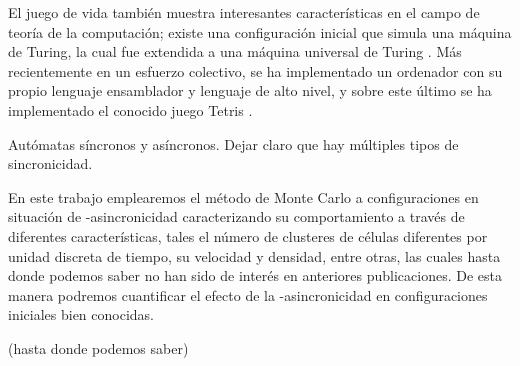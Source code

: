\documentclass[../proyecto.tex]{book}
\begin{document}
El juego de vida también muestra interesantes características en el campo de teoría de la computación; existe una configuración inicial que simula una máquina de Turing, la cual fue extendida a una máquina universal de Turing \cite{turing}. Más recientemente en un esfuerzo colectivo, se ha implementado un ordenador con su propio lenguaje ensamblador y lenguaje de alto nivel, y sobre este último se ha implementado el conocido juego Tetris \cite{tetris}.

Autómatas síncronos y asíncronos. Dejar claro que hay múltiples tipos de sincronicidad.

En este trabajo emplearemos el método de Monte Carlo a configuraciones en situación de \alpha -asincronicidad caracterizando su comportamiento a través de diferentes características, tales el número de clusteres de células diferentes por unidad discreta de tiempo, su velocidad y densidad, entre otras, las cuales hasta donde podemos saber no han sido de interés en anteriores publicaciones. De esta manera podremos cuantificar el efecto de la \alpha -asincronicidad en configuraciones iniciales bien conocidas.

(hasta donde podemos saber)
\end{document}

